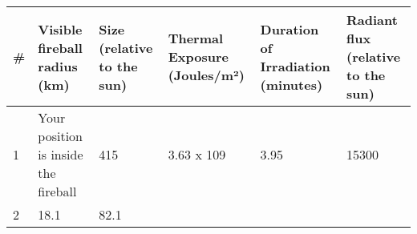\documentclass[
]{article}
\begin{document}
\begin{longtable}[]{@{}llllll@{}}
\toprule
\begin{minipage}[b]{0.02\columnwidth}\raggedright
\#\strut
\end{minipage} & \begin{minipage}[b]{0.21\columnwidth}\raggedright
Visible fireball radius (km)\strut
\end{minipage} & \begin{minipage}[b]{0.13\columnwidth}\raggedright
Size (relative to the sun)\strut
\end{minipage} & \begin{minipage}[b]{0.14\columnwidth}\raggedright
Thermal Exposure (Joules/m²)\strut
\end{minipage} & \begin{minipage}[b]{0.17\columnwidth}\raggedright
Duration of Irradiation (minutes)\strut
\end{minipage} & \begin{minipage}[b]{0.17\columnwidth}\raggedright
Radiant flux (relative to the sun)\strut
\end{minipage}\tabularnewline
\midrule
\endhead
\begin{minipage}[t]{0.02\columnwidth}\raggedright
1\strut
\end{minipage} & \begin{minipage}[t]{0.21\columnwidth}\raggedright
Your position is inside the fireball\strut
\end{minipage} & \begin{minipage}[t]{0.13\columnwidth}\raggedright
415\strut
\end{minipage} & \begin{minipage}[t]{0.14\columnwidth}\raggedright
3.63 x 109\strut
\end{minipage} & \begin{minipage}[t]{0.17\columnwidth}\raggedright
3.95\strut
\end{minipage} & \begin{minipage}[t]{0.17\columnwidth}\raggedright
15300\strut
\end{minipage}\tabularnewline
\begin{minipage}[t]{0.02\columnwidth}\raggedright
2\strut
\end{minipage} & \begin{minipage}[t]{0.21\columnwidth}\raggedright
18.1\strut
\end{minipage} & \begin{minipage}[t]{0.13\columnwidth}\raggedright
82.1\strut
\end{minipage} & \begin{minipage}[t]{0.14\columnwidth}\raggedright

\end{minipage}
\end{longtable}
\end{document}
